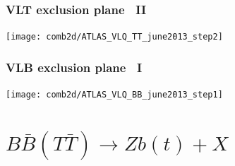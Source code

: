 \documentclass[xcolor=dvipsnames,10pt]{beamer}
\begin{document}
\begin{frame}\frametitle{VLT exclusion plane~\cite{combination} II}
\footnotesize\centering

\texttt{[image: comb2d/ATLAS\_VLQ\_TT\_june2013\_step2]}

\end{frame}


\begin{frame}\frametitle{VLB exclusion plane~\cite{combination} I}
\footnotesize\centering

\texttt{[image: comb2d/ATLAS\_VLQ\_BB\_june2013\_step1]}

\end{frame}




\section{$B\bar{B}(T\bar{T})\to Zb(t)+X$}
\end{document}
